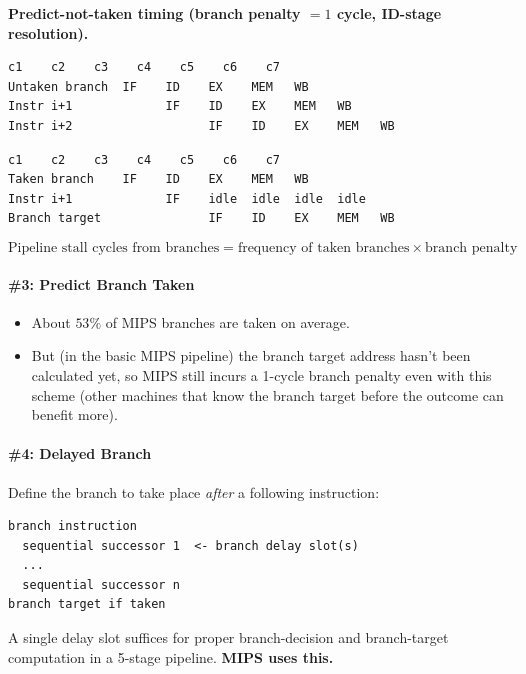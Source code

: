 \textbf{Predict-not-taken timing (branch penalty $=1$ cycle, ID-stage resolution).}
\begin{lstlisting}[caption={Not taken (no stall)}]
                c1    c2    c3    c4    c5    c6    c7
Untaken branch  IF    ID    EX    MEM   WB
Instr i+1             IF    ID    EX    MEM   WB
Instr i+2                   IF    ID    EX    MEM   WB
\end{lstlisting}
\begin{lstlisting}[caption={Taken (1 idle cycle)}]
                c1    c2    c3    c4    c5    c6    c7
Taken branch    IF    ID    EX    MEM   WB
Instr i+1             IF    idle  idle  idle  idle
Branch target               IF    ID    EX    MEM   WB
\end{lstlisting}
\begin{prop}
\[
  \text{Pipeline stall cycles from branches} = \text{frequency of taken branches} \times \text{branch penalty}
\]
\end{prop}

\paragraph{\#3: Predict Branch Taken}
\begin{itemize}
  \item About $53\%$ of MIPS branches are taken on average.
  \item But (in the basic MIPS pipeline) the branch target address hasn't
  been calculated yet, so MIPS still incurs a 1-cycle branch penalty even
  with this scheme (other machines that know the branch target before the
  outcome can benefit more).
\end{itemize}

\paragraph{\#4: Delayed Branch}

\begin{definition}
Define the branch to take place \emph{after} a following instruction:
\begin{lstlisting}
branch instruction
  sequential successor 1  <- branch delay slot(s)
  ...
  sequential successor n
branch target if taken
\end{lstlisting}
A single delay slot suffices for proper branch-decision and branch-target
computation in a 5-stage pipeline. \textbf{MIPS uses this.}
\end{definition}

